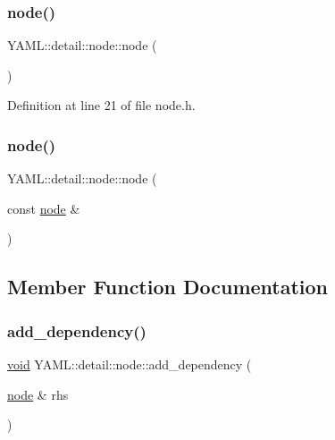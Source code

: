 \subsubsection{\texorpdfstring{node()}{node()}\hspace{0.1cm}{\footnotesize\ttfamily [1/2]}}
{\footnotesize\ttfamily Y\+A\+M\+L\+::detail\+::node\+::node (\begin{DoxyParamCaption}{ }\end{DoxyParamCaption})\hspace{0.3cm}{\ttfamily [inline]}}



Definition at line 21 of file node.\+h.

\mbox{\label{class_y_a_m_l_1_1detail_1_1node_a1b9862913ca0cf80a8867ee6b5d2673b}} 
\subsubsection{\texorpdfstring{node()}{node()}\hspace{0.1cm}{\footnotesize\ttfamily [2/2]}}
{\footnotesize\ttfamily Y\+A\+M\+L\+::detail\+::node\+::node (\begin{DoxyParamCaption}\item[{const \mbox{\hyperlink{class_y_a_m_l_1_1detail_1_1node}{node}} \&}]{ }\end{DoxyParamCaption})\hspace{0.3cm}{\ttfamily [delete]}}



\subsection{Member Function Documentation}
\mbox{\label{class_y_a_m_l_1_1detail_1_1node_a8308e7b5e348fdf28222da904cba6738}} 
\subsubsection{\texorpdfstring{add\_dependency()}{add\_dependency()}}
{\footnotesize\ttfamily \mbox{\hyperlink{glad_8h_a950fc91edb4504f62f1c577bf4727c29}{void}} Y\+A\+M\+L\+::detail\+::node\+::add\+\_\+dependency (\begin{DoxyParamCaption}\item[{\mbox{\hyperlink{class_y_a_m_l_1_1detail_1_1node}{node}} \&}]{rhs }\end{DoxyParamCaption})\hspace{0.3cm}{\ttfamily [inline]}}



